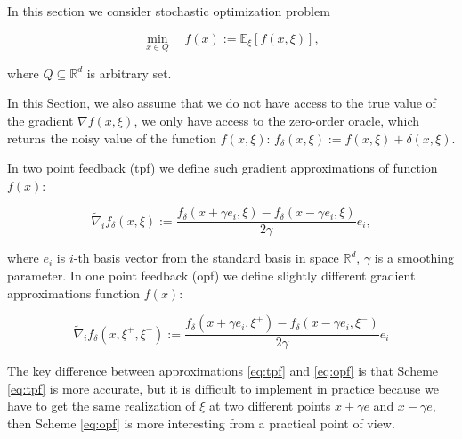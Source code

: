         In this section we consider stochastic optimization problem 
    
        \begin{equation}
        \label{eq:problem_stoch}
            \underset{x \in Q}{\min} \quad f(x) := 
            \mathbb{E}_{\xi}\left[f(x, \xi)\right],
        \end{equation}
    
        where $Q \subseteq \mathbb{R}^d$ is arbitrary set.
    
        

        In this Section, we also assume that we do not have access to the true value of the gradient $\nabla f(x, \xi)$, we only have access to the zero-order oracle, which returns the noisy value of the function $f(x, \xi)$: $f_{\delta}(x, \xi) := f(x, \xi) + \delta(x, \xi)$.
    
        In two point feedback (tpf) we define such gradient approximations of function $f(x)$:
    
        \begin{equation}\label{eq:tpf}
            \widetilde{\nabla}_if_\delta(x, \xi) :=  \dfrac{f_\delta(x + \gamma e_i, \xi) - f_\delta(x - \gamma e_i, \xi)}{2 \gamma} e_i,
        \end{equation}
    
        where $e_i$ is $i$-th basis vector from the standard basis in space $\mathbb{R}^d$, $\gamma$ is a smoothing parameter. In one point feedback (opf) we define slightly different gradient approximations function $f(x)$:
    
        \begin{equation}\label{eq:opf}
            \widetilde{\nabla}_if_\delta(x, \xi^+, \xi^-) :=  \dfrac{f_\delta(x + \gamma e_i, \xi^+) - f_\delta(x - \gamma e_i, \xi^-)}{2 \gamma} e_i
        \end{equation}
    
        The key difference between approximations \eqref{eq:tpf} and \eqref{eq:opf} is that Scheme \eqref{eq:tpf} is more accurate, but it is difficult to implement in practice because we have to get the same realization of $\xi$ at two different points $x + \gamma e$ and $x - \gamma e$, then Scheme \eqref{eq:opf} is more interesting from a practical point of view.
    
